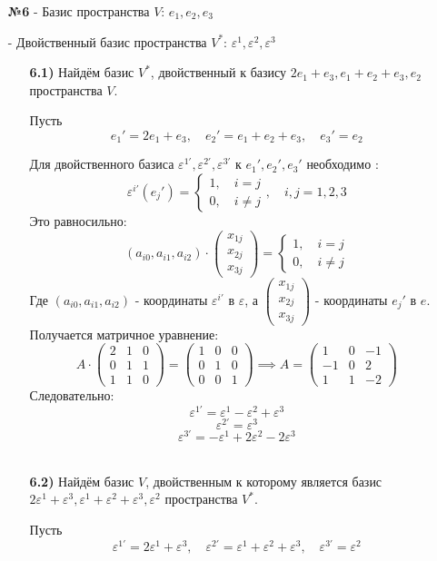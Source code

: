 \documentclass[a4paper]{article}
\newcommand{\mat}[1]{\begin{pmatrix} #1 \end{pmatrix}}
\newcommand{\case}[1]{\begin{cases} #1 \end{cases}}
\begin{document}
\begin{enumerate}
    \item[\textbf{№6}]
    - Базис пространства $ V $: $ e_{1}, e_{2}, e_{3} $

    - Двойственный базис пространства $ V^{*} $: $ \varepsilon^{1}, \varepsilon^{2}, \varepsilon^{3} $

    \begin{enumerate}
        \item[\textbf{6.1)}] Найдём базис $ V^{*} $, двойственный к базису $ 2 e_{1}+e_{3}, e_{1}+e_{2}+e_{3}, e_{2} $ пространства $ V $.
        
        Пусть $$e_1' = 2 e_{1} + e_{3} ,\quad  e_2' = e_{1} + e_{2} + e_{3} , \quad e_3' = e_{2}$$

        Для двойственного базиса $ \varepsilon^{1'}, \varepsilon^{2'}, \varepsilon^{3'} $ к $ e_1', e_2', e_3' $ необходимо :
        $$
        \varepsilon^{i'}(e_j') = \case{1, \quad i=j\\0, \quad i\neq j}, \quad i,j = 1, 2, 3
        $$
        Это равносильно:
        $$(a_{i0}, a_{i1}, a_{i2})\cdot \mat{x_{1j}\\x_{2j}\\x_{3j}} = \case{1, \quad i=j\\0, \quad i\neq j}$$
        Где $(a_{i0}, a_{i1}, a_{i2})$ - координаты $\varepsilon^{i'}$ в $\varepsilon$, а $\mat{x_{1j}\\x_{2j}\\x_{3j}}$ - координаты $e_j'$ в $e$. Получается матричное уравнение:
        $$A\cdot\mat{2&1&0\\0&1&1\\1&1&0} = \mat{1&0&0\\0&1&0\\0&0&1} \implies A = \mat{1 & 0 & -1 \\
        -1 & 0 & 2 \\
        1 & 1 & -2}$$
        Следовательно:
        $$\varepsilon^{1'} = \varepsilon^{1}-\varepsilon^{2}+\varepsilon^{3}$$
        $$\varepsilon^{2'} = \varepsilon^{3}$$
        $$\varepsilon^{3'} = -\varepsilon^{1}+2\varepsilon^{2}-2\varepsilon^{3}$$\\

        \item[\textbf{6.2)}]Найдём базис $ V $, двойственным к которому является базис $ 2\varepsilon^1+\varepsilon^3, \varepsilon^1+\varepsilon^2+\varepsilon^3, \varepsilon^2 $ пространства $ V^{*} $.
        
        Пусть $$\varepsilon^{1'} = 2\varepsilon^1+\varepsilon^3,\quad  \varepsilon^{2'} = \varepsilon^1+\varepsilon^2+\varepsilon^3 , \quad \varepsilon^{3'} = \varepsilon^2 $$
        

\end{enumerate}
\end{enumerate}
\end{document}
